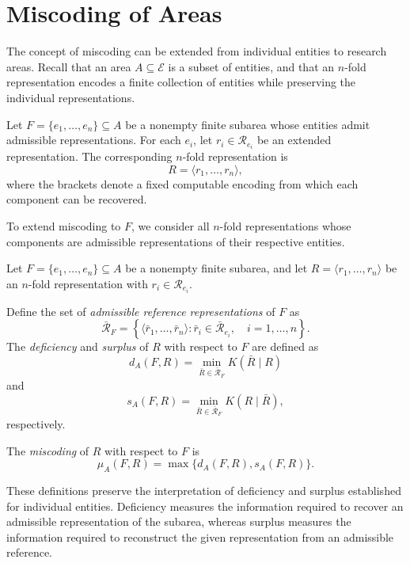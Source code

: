 %
%

\section{Miscoding of Areas}
\label{sec:miscoding_areas}

The concept of miscoding can be extended from individual entities to research areas. Recall that an area $A\subseteq\mathcal E$ is a subset of entities, and that an $n$-fold representation encodes a finite collection of entities while preserving the individual representations.

Let $F=\{e_1,\ldots,e_n\}\subseteq A$ be a nonempty finite subarea whose entities admit admissible representations. For each $e_i$, let $r_i\in\mathcal R_{e_i}$ be an extended representation. The corresponding $n$-fold representation is
\[
R=\langle r_1,\ldots,r_n\rangle,
\]
where the brackets denote a fixed computable encoding from which each component can be recovered.

To extend miscoding to $F$, we consider all $n$-fold representations whose components are admissible representations of their respective entities.

\begin{definition}
\label{def:miscoding_areas}
Let $F=\{e_1,\ldots,e_n\}\subseteq A$ be a nonempty finite subarea, and let $R=\langle r_1,\ldots,r_n\rangle$ be an $n$-fold representation with $r_i\in\mathcal R_{e_i}$.

Define the set of \emph{admissible reference representations} of $F$ as
\[
\bar{\mathcal R}_F = \left\{ \langle\bar r_1,\ldots,\bar r_n\rangle : 
\bar r_i\in\bar{\mathcal R}_{e_i}, \quad i=1,\ldots,n \right\}.
\]
The \emph{deficiency} and \emph{surplus} of $R$ with respect to $F$ are defined as
\[
d_A(F,R) = \min_{\bar R\in\bar{\mathcal R}_F} K(\bar R\mid R)
\]
and
\[
s_A(F,R) = \min_{\bar R\in\bar{\mathcal R}_F} K(R\mid\bar R),
\]
respectively.

The \emph{miscoding} of $R$ with respect to $F$ is
\[
\mu_A(F,R) = \max\{d_A(F,R),s_A(F,R)\}.
\]
\end{definition}

These definitions preserve the interpretation of deficiency and surplus established for individual entities. Deficiency measures the information required to recover an admissible representation of the subarea, whereas surplus measures the information required to reconstruct the given representation from an admissible reference.

